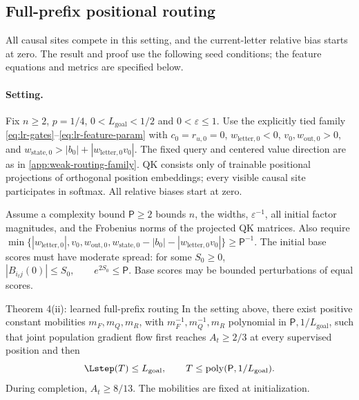 \providecommand{\LRnorm}[1]{\left\lVert #1\right\rVert}
\subsection{Full-prefix positional routing}
\label{app:weak-seeded-full-prefix-routing}

All causal sites compete in this setting, and the current-letter relative bias
starts at zero. The result and proof use the following seed conditions; the
feature equations and metrics are specified below.



\paragraph{Setting.}\label{app:lr-setting}
Fix $n\ge2$, $p=1/4$, $0<L_{\mathrm{goal}}<1/2$ and $0<\varepsilon\le1$.
Use the explicitly tied family \eqref{eq:lr-gates}--\eqref{eq:lr-feature-param}
with $c_0=r_{u,0}=0$, $w_{\mathrm{letter},0}<0$, $v_0,w_{\mathrm{out},0}>0$, and
$w_{\mathrm{state},0}>|b_0|+|w_{\mathrm{letter},0}v_0|$. The fixed query and centered value direction
are as in \cref{app:weak-routing-family}. QK consists only of trainable
positional projections of orthogonal position embeddings; every visible
causal site participates in softmax. All relative biases start at zero.

Assume a complexity bound $\mathsf P\ge2$ bounds $n$, the widths,
$\varepsilon^{-1}$, all initial factor magnitudes, and the Frobenius norms
of the projected QK matrices. Also require
 $\min\{|w_{\mathrm{letter},0}|,v_0,w_{\mathrm{out},0},w_{\mathrm{state},0}-|b_0|-|w_{\mathrm{letter},0}v_0|\}\ge \mathsf P^{-1}.$ 
The initial base scores must have moderate spread: for some $S_0\ge0$,
 $|B_{i_tj}(0)|\le S_0,\qquad e^{2S_0}\le \mathsf P.$ 
Base scores may be bounded perturbations of equal scores.

\begin{restated}{Theorem 4(ii): learned full-prefix routing}
In the setting above, there exist positive constant mobilities
$m_F,m_Q,m_R$, with $m_F^{-1},m_Q^{-1},m_R$
polynomial in $\mathsf P,1/L_{\mathrm{goal}}$, such that joint population gradient flow first
reaches $A_t\ge2/3$ at every supervised position and then
\begin{equation}\label{eq:lr-finite-theorem}
 \Lstep(T)\le L_{\mathrm{goal}},\qquad T\le\operatorname{poly}(\mathsf P,1/L_{\mathrm{goal}}).
\end{equation}
During completion, $A_t\ge8/13$. The mobilities are fixed at initialization.
\end{restated}



